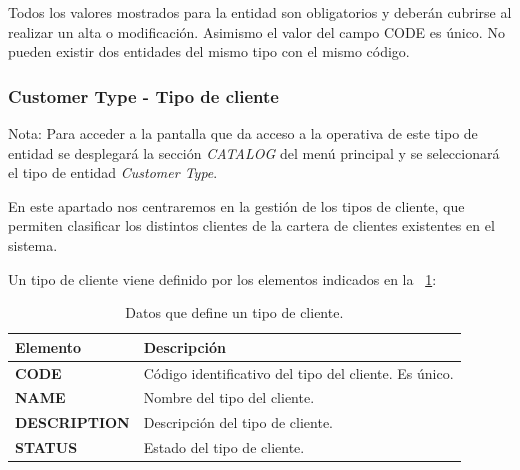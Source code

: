 Todos los valores mostrados para la entidad son obligatorios y deberán cubrirse al realizar un alta o modificación. Asimismo el valor del campo CODE es único. No pueden existir dos entidades del mismo tipo con el mismo código.



\subsubsection{Customer Type - Tipo de cliente}
\label{sub:customer-type}

Nota: Para acceder a la pantalla que da acceso a la operativa de este tipo de entidad se desplegará la sección \emph{CATALOG} del menú principal y se seleccionará el tipo de entidad \emph{Customer Type}.

En este apartado nos centraremos en la gestión de los tipos de cliente, que permiten clasificar los distintos clientes de la cartera de clientes existentes en el sistema.


Un tipo de cliente viene definido por los elementos indicados en la \tablename~\ref{tab:tipo-cliente}:



\begin{table}[H]
  \centering
  \setlength{\leftmargini}{0.4cm}
  \resizebox{14cm}{!} {
  \begin{tabular}{|m{3cm} m{11cm}|}
  \rowcolor{udcpink!25}
  \hline
  	\textbf{Elemento} & \textbf{Descripción} \\\hline
	\textbf{CODE} & Código identificativo del tipo del cliente. Es único.   \\
	\textbf{NAME} & Nombre del tipo del cliente. \\
	\textbf{DESCRIPTION} & Descripción del tipo de cliente. \\	
	\textbf{STATUS} & Estado del tipo de cliente.
	\\\hline
  \end{tabular}
  } %
  \caption{Datos que define un tipo de cliente.}
  \label{tab:tipo-cliente}
\end{table}


